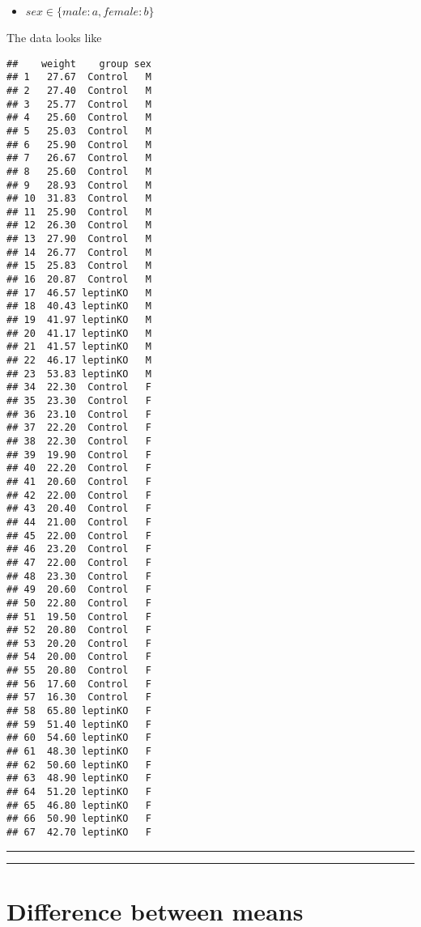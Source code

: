 \documentclass[
]{book}
\providecommand{\tightlist}{%
  \setlength{\itemsep}{0pt}\setlength{\parskip}{0pt}}
\begin{document}
\begin{itemize}
\tightlist
\item
  \(sex \in \{male:a,female:b\}\)
\end{itemize}

The data looks like

\begin{verbatim}
##    weight    group sex
## 1   27.67  Control   M
## 2   27.40  Control   M
## 3   25.77  Control   M
## 4   25.60  Control   M
## 5   25.03  Control   M
## 6   25.90  Control   M
## 7   26.67  Control   M
## 8   25.60  Control   M
## 9   28.93  Control   M
## 10  31.83  Control   M
## 11  25.90  Control   M
## 12  26.30  Control   M
## 13  27.90  Control   M
## 14  26.77  Control   M
## 15  25.83  Control   M
## 16  20.87  Control   M
## 17  46.57 leptinKO   M
## 18  40.43 leptinKO   M
## 19  41.97 leptinKO   M
## 20  41.17 leptinKO   M
## 21  41.57 leptinKO   M
## 22  46.17 leptinKO   M
## 23  53.83 leptinKO   M
## 34  22.30  Control   F
## 35  23.30  Control   F
## 36  23.10  Control   F
## 37  22.20  Control   F
## 38  22.30  Control   F
## 39  19.90  Control   F
## 40  22.20  Control   F
## 41  20.60  Control   F
## 42  22.00  Control   F
## 43  20.40  Control   F
## 44  21.00  Control   F
## 45  22.00  Control   F
## 46  23.20  Control   F
## 47  22.00  Control   F
## 48  23.30  Control   F
## 49  20.60  Control   F
## 50  22.80  Control   F
## 51  19.50  Control   F
## 52  20.80  Control   F
## 53  20.20  Control   F
## 54  20.00  Control   F
## 55  20.80  Control   F
## 56  17.60  Control   F
## 57  16.30  Control   F
## 58  65.80 leptinKO   F
## 59  51.40 leptinKO   F
## 60  54.60 leptinKO   F
## 61  48.30 leptinKO   F
## 62  50.60 leptinKO   F
## 63  48.90 leptinKO   F
## 64  51.20 leptinKO   F
## 65  46.80 leptinKO   F
## 66  50.90 leptinKO   F
## 67  42.70 leptinKO   F
\end{verbatim}

\begin{center}\rule{0.5\linewidth}{0.5pt}\end{center}

\begin{center}\rule{0.5\linewidth}{0.5pt}\end{center}

\hypertarget{difference-between-means-10}{%
\section{Difference between means}\label{difference-between-means-10}}
\end{document}
